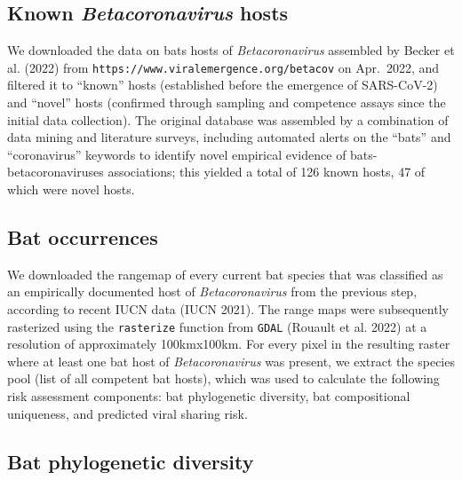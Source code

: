 \documentclass[11pt]{article}
\begin{document}
\hypertarget{known-betacoronavirus-hosts}{%
\subsection{\texorpdfstring{Known \emph{Betacoronavirus}
hosts}{Known Betacoronavirus hosts}}\label{known-betacoronavirus-hosts}}

We downloaded the data on bats hosts of \emph{Betacoronavirus} assembled
by Becker et al. (2022) from
\texttt{https://www.viralemergence.org/betacov} on Apr.~2022, and
filtered it to ``known'' hosts (established before the emergence of
SARS-CoV-2) and ``novel'' hosts (confirmed through sampling and
competence assays since the initial data collection). The original
database was assembled by a combination of data mining and literature
surveys, including automated alerts on the ``bats'' and ``coronavirus''
keywords to identify novel empirical evidence of bats-betacoronaviruses
associations; this yielded a total of 126 known hosts, 47 of which were
novel hosts.

\hypertarget{bat-occurrences}{%
\subsection{Bat occurrences}\label{bat-occurrences}}

We downloaded the rangemap of every current bat species that was
classified as an empirically documented host of \emph{Betacoronavirus}
from the previous step, according to recent IUCN data (IUCN 2021). The
range maps were subsequently rasterized using the \texttt{rasterize}
function from \texttt{GDAL} (Rouault et al. 2022) at a resolution of
approximately 100kmx100km. For every pixel in the resulting raster where
at least one bat host of \emph{Betacoronavirus} was present, we extract
the species pool (list of all competent bat hosts), which was used to
calculate the following risk assessment components: bat phylogenetic
diversity, bat compositional uniqueness, and predicted viral sharing
risk.

\hypertarget{bat-phylogenetic-diversity}{%
\subsection{Bat phylogenetic
diversity}\label{bat-phylogenetic-diversity}}
\end{document}
